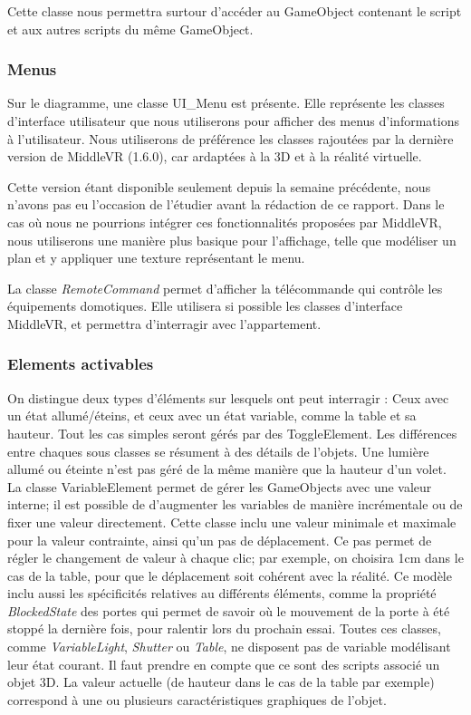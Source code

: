 Cette classe nous permettra surtour d'accéder au GameObject contenant le script et aux autres scripts du même GameObject.

\subsubsection{Menus}
Sur le diagramme, une classe UI\_Menu est présente. Elle représente les classes d'interface utilisateur que nous utiliserons pour afficher des menus d'informations à l'utilisateur. Nous utiliserons de préférence les classes rajoutées par la dernière version de MiddleVR (1.6.0), car ardaptées à la 3D et à la réalité virtuelle.\newline

Cette version étant disponible seulement depuis la semaine précédente, nous n'avons pas eu l'occasion de l'étudier avant la rédaction de ce rapport. Dans le cas où nous ne pourrions intégrer ces fonctionnalités proposées par MiddleVR, nous utiliserons une manière plus basique pour l'affichage, telle que modéliser un plan et y appliquer une texture représentant le menu.\newline

La classe \textit{RemoteCommand} permet d'afficher la télécommande qui contrôle les équipements domotiques. 
Elle utilisera si possible les classes d'interface MiddleVR, et permettra d'interragir avec l'appartement.


\subsubsection{Elements activables}
On distingue deux types d'éléments sur lesquels ont peut interragir : Ceux avec un état allumé/éteins, et ceux avec un état variable, comme la table et sa hauteur.
Tout les cas simples seront gérés par des ToggleElement. Les différences entre chaques sous classes se résument à des détails de l'objets.
Une lumière allumé ou éteinte n'est pas géré de la même manière que la hauteur d'un volet.
La classe VariableElement permet de gérer les GameObjects avec une valeur interne; il est possible de d'augmenter les variables de manière incrémentale ou de fixer une valeur directement.
Cette classe inclu une valeur minimale et maximale pour la valeur contrainte, ainsi qu'un pas de déplacement.
Ce pas permet de régler le changement de valeur à chaque clic; par exemple, on choisira 1cm dans le cas de la table, pour que le déplacement soit cohérent avec la réalité.
Ce modèle inclu aussi les spécificités relatives au différents éléments, comme la propriété \textit{BlockedState} des portes qui permet de savoir où le mouvement de la porte à été stoppé la dernière fois, pour ralentir lors du prochain essai.
\newline
Toutes ces classes, comme \textit{VariableLight}, \textit{Shutter} ou \textit{Table},  ne disposent pas de variable modélisant leur état courant. 
Il faut prendre en compte que ce sont des scripts associé un objet 3D. 
La valeur actuelle (de hauteur dans le cas de la table par exemple) correspond à une ou plusieurs caractéristiques graphiques de l'objet.

